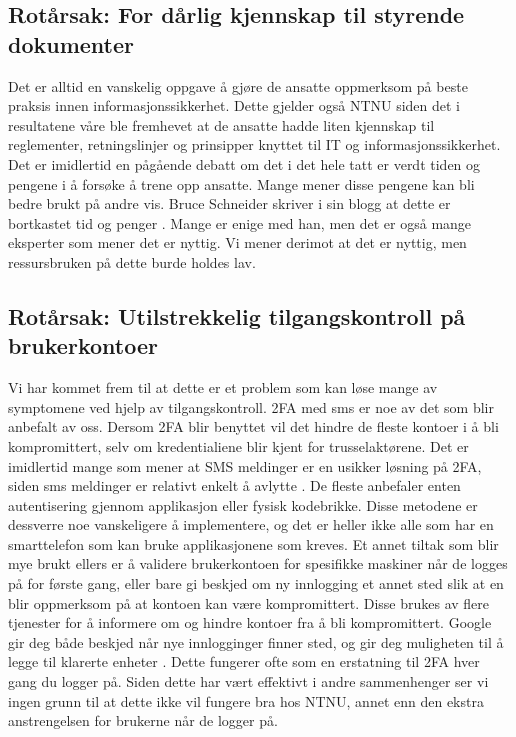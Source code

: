 \subsection{Rotårsak: For dårlig kjennskap til styrende dokumenter}
Det er alltid en vanskelig oppgave å gjøre de ansatte oppmerksom på beste praksis innen informasjonssikkerhet. Dette gjelder også NTNU siden det i resultatene våre ble fremhevet at de ansatte hadde liten kjennskap til reglementer, retningslinjer og prinsipper knyttet til IT og informasjonssikkerhet. Det er imidlertid en pågående debatt om det i det hele tatt er verdt tiden og pengene i å forsøke å trene opp ansatte. Mange mener disse pengene kan bli bedre brukt på andre vis. Bruce Schneider skriver i sin blogg at dette er bortkastet tid og penger \cite{SecAware}. Mange er enige med han, men det er også mange eksperter som mener det er nyttig. Vi mener derimot at det er nyttig, men ressursbruken på dette burde holdes lav. 

\subsection{Rotårsak: Utilstrekkelig tilgangskontroll på brukerkontoer}
Vi har kommet frem til at dette er et problem som kan løse mange av symptomene ved hjelp av tilgangskontroll. 2FA med sms er noe av det som blir anbefalt av oss. Dersom 2FA blir benyttet vil det hindre de fleste kontoer i å bli kompromittert, selv om kredentialiene blir kjent for trusselaktørene. Det er imidlertid mange som mener at SMS meldinger er en usikker løsning på 2FA, siden sms meldinger er relativt enkelt å avlytte \cite{2FA}. De fleste anbefaler enten autentisering gjennom applikasjon eller fysisk kodebrikke. Disse metodene er dessverre noe vanskeligere å implementere, og det er heller ikke alle som har en smarttelefon som kan bruke applikasjonene som kreves. Et annet tiltak som blir mye brukt ellers er å validere brukerkontoen for spesifikke maskiner når de logges på for første gang, eller bare gi beskjed om ny innlogging et annet sted slik at en blir oppmerksom på at kontoen kan være kompromittert. Disse brukes av flere tjenester for å informere om og hindre kontoer fra å bli kompromittert. Google gir deg både beskjed når nye innlogginger finner sted, og gir deg muligheten til å legge til klarerte enheter \cite{trustcomp}. Dette fungerer ofte som en erstatning til 2FA hver gang du logger på. Siden dette har vært effektivt i andre sammenhenger ser vi ingen grunn til at dette ikke vil fungere bra hos NTNU, annet enn den ekstra anstrengelsen for brukerne når de logger på. 

